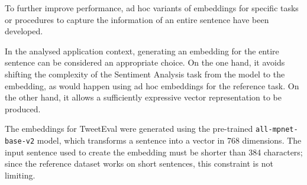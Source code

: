 To further improve performance, ad hoc variants of embeddings for specific tasks\cite{sentimentEmbedding} or procedures to capture the information of an entire sentence\cite{sentence-bert} have been developed.

In the analysed application context, generating an embedding for the entire sentence can be considered an appropriate choice. On the one hand, it avoids shifting the complexity of the Sentiment Analysis task from the model to the embedding, as would happen using ad hoc embeddings for the reference task. On the other hand, it allows a sufficiently expressive vector representation to be produced.

The embeddings for TweetEval were generated using the pre-trained \verb|all-mpnet-base-v2| model, which transforms a sentence into a vector in 768 dimensions. The input sentence used to create the embedding must be shorter than 384 characters; since the reference dataset works on short sentences, this constraint is not limiting.